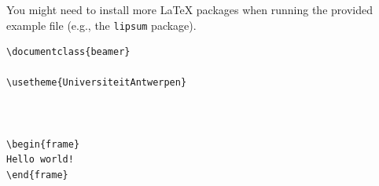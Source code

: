\begin{note}
You might need to install more \LaTeX{} packages when running the provided
example file (e.g., the \texttt{lipsum} package).
\end{note}

\begin{lstlisting}[float,caption={A minimalistic test file for the UA Beamer theme.},captionpos=b,label=listing:minex,abovecaptionskip=\bigskipamount]
\documentclass{beamer}

\usetheme{UniversiteitAntwerpen}



\begin{frame}
Hello world!
\end{frame}


\end{lstlisting}

